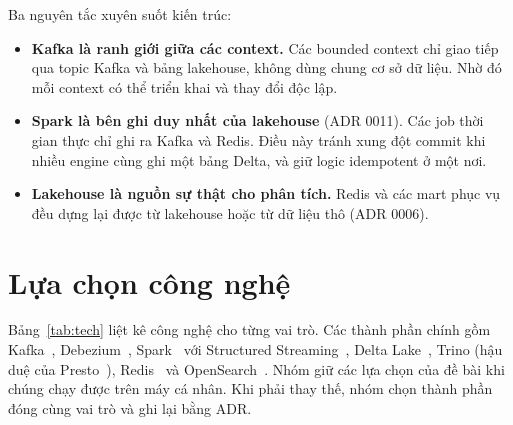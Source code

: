 Ba nguyên tắc xuyên suốt kiến trúc:
\begin{itemize}
  \item \textbf{Kafka là ranh giới giữa các context.} Các bounded context chỉ giao tiếp qua topic Kafka và bảng lakehouse, không dùng chung cơ sở dữ liệu. Nhờ đó mỗi context có thể triển khai và thay đổi độc lập.
  \item \textbf{Spark là bên ghi duy nhất của lakehouse} (ADR 0011). Các job thời gian thực chỉ ghi ra Kafka và Redis. Điều này tránh xung đột commit khi nhiều engine cùng ghi một bảng Delta, và giữ logic idempotent ở một nơi.
  \item \textbf{Lakehouse là nguồn sự thật cho phân tích.} Redis và các mart phục vụ đều dựng lại được từ lakehouse hoặc từ dữ liệu thô (ADR 0006).
\end{itemize}

\section{Lựa chọn công nghệ}

Bảng~\ref{tab:tech} liệt kê công nghệ cho từng vai trò. Các thành phần chính gồm Kafka~\cite{kreps2011kafka}, Debezium~\cite{debezium}, Spark~\cite{zaharia2016spark} với Structured Streaming~\cite{armbrust2018structured}, Delta Lake~\cite{armbrust2020delta}, Trino (hậu duệ của Presto~\cite{sethi2019presto}), Redis~\cite{redis} và OpenSearch~\cite{opensearch}. Nhóm giữ các lựa chọn của đề bài khi chúng chạy được trên máy cá nhân. Khi phải thay thế, nhóm chọn thành phần đóng cùng vai trò và ghi lại bằng ADR.

